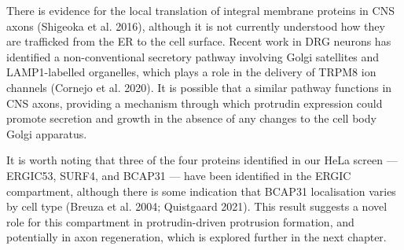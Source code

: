 \documentclass[
]{article}
\begin{document}
There is evidence for the local translation of integral membrane
proteins in CNS axons (Shigeoka et al. 2016), although it is not
currently understood how they are trafficked from the ER to the cell
surface. Recent work in DRG neurons has identified a non-conventional
secretory pathway involving Golgi satellites and LAMP1-labelled
organelles, which plays a role in the delivery of TRPM8 ion channels
(Cornejo et al. 2020). It is possible that a similar pathway functions
in CNS axons, providing a mechanism through which protrudin expression
could promote secretion and growth in the absence of any changes to the
cell body Golgi apparatus.

It is worth noting that three of the four proteins identified in our
HeLa screen --- ERGIC53, SURF4, and BCAP31 --- have been identified in
the ERGIC compartment, although there is some indication that BCAP31
localisation varies by cell type (Breuza et al. 2004; Quistgaard 2021).
This result suggests a novel role for this compartment in
protrudin-driven protrusion formation, and potentially in axon
regeneration, which is explored further in the next chapter.
\end{document}
